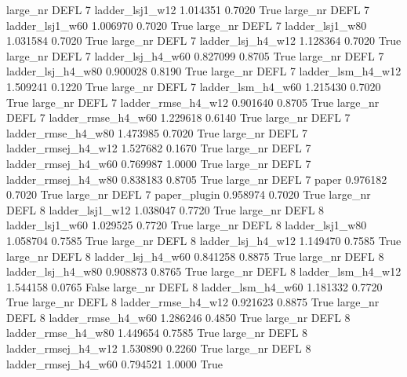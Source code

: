   large_nr     DEFL                 7     ladder_lsj1_w12    1.014351      0.7020    True
  large_nr     DEFL                 7     ladder_lsj1_w60    1.006970      0.7020    True
  large_nr     DEFL                 7     ladder_lsj1_w80    1.031584      0.7020    True
  large_nr     DEFL                 7   ladder_lsj_h4_w12    1.128364      0.7020    True
  large_nr     DEFL                 7   ladder_lsj_h4_w60    0.827099      0.8705    True
  large_nr     DEFL                 7   ladder_lsj_h4_w80    0.900028      0.8190    True
  large_nr     DEFL                 7   ladder_lsm_h4_w12    1.509241      0.1220    True
  large_nr     DEFL                 7   ladder_lsm_h4_w60    1.215430      0.7020    True
  large_nr     DEFL                 7  ladder_rmse_h4_w12    0.901640      0.8705    True
  large_nr     DEFL                 7  ladder_rmse_h4_w60    1.229618      0.6140    True
  large_nr     DEFL                 7  ladder_rmse_h4_w80    1.473985      0.7020    True
  large_nr     DEFL                 7 ladder_rmsej_h4_w12    1.527682      0.1670    True
  large_nr     DEFL                 7 ladder_rmsej_h4_w60    0.769987      1.0000    True
  large_nr     DEFL                 7 ladder_rmsej_h4_w80    0.838183      0.8705    True
  large_nr     DEFL                 7               paper    0.976182      0.7020    True
  large_nr     DEFL                 7        paper_plugin    0.958974      0.7020    True
  large_nr     DEFL                 8     ladder_lsj1_w12    1.038047      0.7720    True
  large_nr     DEFL                 8     ladder_lsj1_w60    1.029525      0.7720    True
  large_nr     DEFL                 8     ladder_lsj1_w80    1.058704      0.7585    True
  large_nr     DEFL                 8   ladder_lsj_h4_w12    1.149470      0.7585    True
  large_nr     DEFL                 8   ladder_lsj_h4_w60    0.841258      0.8875    True
  large_nr     DEFL                 8   ladder_lsj_h4_w80    0.908873      0.8765    True
  large_nr     DEFL                 8   ladder_lsm_h4_w12    1.544158      0.0765   False
  large_nr     DEFL                 8   ladder_lsm_h4_w60    1.181332      0.7720    True
  large_nr     DEFL                 8  ladder_rmse_h4_w12    0.921623      0.8875    True
  large_nr     DEFL                 8  ladder_rmse_h4_w60    1.286246      0.4850    True
  large_nr     DEFL                 8  ladder_rmse_h4_w80    1.449654      0.7585    True
  large_nr     DEFL                 8 ladder_rmsej_h4_w12    1.530890      0.2260    True
  large_nr     DEFL                 8 ladder_rmsej_h4_w60    0.794521      1.0000    True
